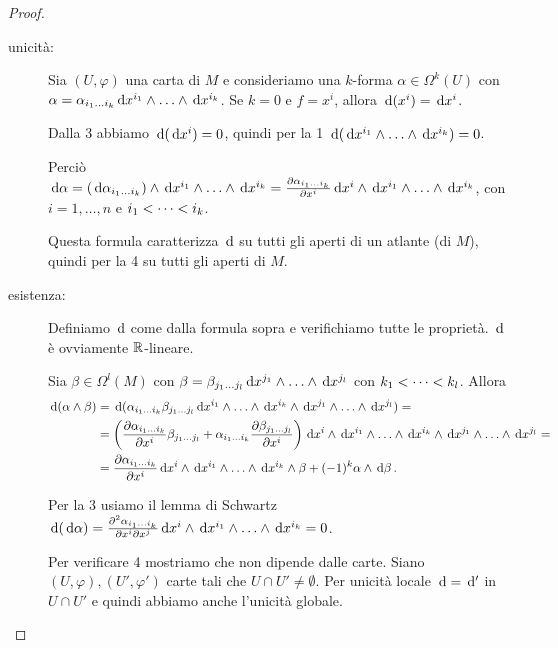 \begin{proof}
	\begin{description} %
		\item [unicità:] Sia $(U,\varphi)$ una carta di $M$ e consideriamo una $k$-forma $\alpha\in\Omega^k(U)$ con $\alpha = \alpha_{\seqb ik{}} \de x^{i_1} \wedge \ldots \wedge \de x^{i_k}$.
		Se $k=0$ e $f=x^i$, allora $\de(x^i) = \de x^i$.
		
		Dalla 3 abbiamo $\de(\de x^i) = 0$, quindi per la 1 $\de(\de x^{i_1} \wedge \ldots \wedge \de x^{i_k}) = 0$.
		
		Perciò $\de\alpha = (\de \alpha_{\seqb ik{}}) \wedge \de x^{i_1} \wedge \ldots\wedge \de x^{i_k} = \DerParz{\alpha_{\seqb ik{}}} {x^i} \de x^i \wedge \de x^{i_1} \wedge\ldots \wedge \de x^{i_k}$, con $i=1,\ldots,n$ e $\seqb ik<$.
		
		Questa formula caratterizza $\de$ su tutti gli aperti di un atlante (di $M$), quindi per la 4 su tutti gli aperti di $M$.
		\item [esistenza:] Definiamo $\de$ come dalla formula sopra e verifichiamo tutte le proprietà. $\de$ è ovviamente $\R$-lineare.
		
		Sia $\beta\in\Omega^l(M)$ con $\beta= \beta_{\seqb jl{}} \de x^{j_1} \wedge\ldots\wedge \de x^{j_l}$ con $\seqb kl<$. Allora
		\begin{align*}
			\de (\alpha \wedge \beta) &= \de (\alpha_{\seqb ik{}} \beta_{\seqb jl{}} \de x^{i_1} \wedge\ldots\wedge \de x^{i_k}\wedge \de x^{j_1} \wedge\ldots\wedge \de x^{j_l}) =\\
			&= \left(\DerParz{\alpha_{\seqb ik{}}}{x^i} \beta_{\seqb jl{}} + \alpha_{\seqb ik{}} \DerParz{\beta_{\seqb jl{}}}{x^i} \right) \de x^i\wedge\de x^{i_1} \wedge\ldots\wedge \de x^{i_k}\wedge \de x^{j_1} \wedge\ldots\wedge \de x^{j_l} = \\
			&=\DerParz{\alpha_{\seqb ik{}}}{x^i} \de x^i\wedge\de x^{i_1} \wedge\ldots\wedge \de x^{i_k} \wedge \beta + (-1)^k \alpha \wedge \de \beta \punto
		\end{align*}
		
		Per la 3 usiamo il lemma di Schwartz $\de(\de\alpha) = \frac{\partial^2 \alpha_{\seqb ik{}}}{\partial x^i \partial x^j} \de x^i\wedge\de x^{i_1} \wedge\ldots\wedge \de x^{i_k} =0$.
		
		Per verificare 4 mostriamo che non dipende dalle carte. Siano $(U,\varphi), (U',\varphi')$ carte tali che $U\cap U' \not=\emptyset$. Per unicità locale $\de = \de'$ in $U\cap U'$ e quindi abbiamo anche l'unicità globale.
	\end{description}
\end{proof}

